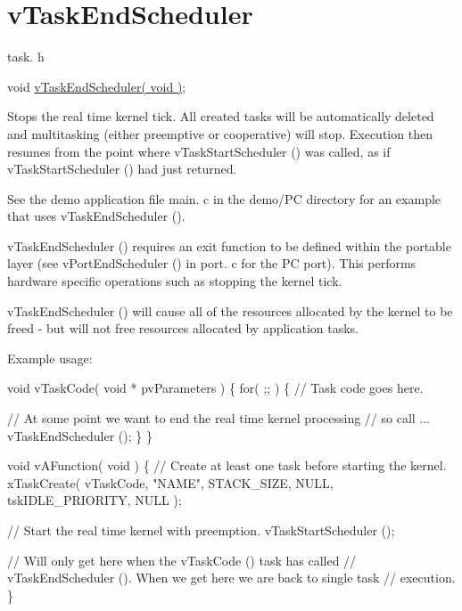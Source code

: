\hypertarget{group__vTaskEndScheduler}{}\section{v\+Task\+End\+Scheduler}
\label{group__vTaskEndScheduler}
task. h 
\begin{DoxyPre}void \hyperlink{task_8h_a1651e13c7ccd6273f53a62425ec79a15}{vTaskEndScheduler( void )};\end{DoxyPre}


Stops the real time kernel tick. All created tasks will be automatically deleted and multitasking (either preemptive or cooperative) will stop. Execution then resumes from the point where v\+Task\+Start\+Scheduler () was called, as if v\+Task\+Start\+Scheduler () had just returned.

See the demo application file main. c in the demo/\+PC directory for an example that uses v\+Task\+End\+Scheduler ().

v\+Task\+End\+Scheduler () requires an exit function to be defined within the portable layer (see v\+Port\+End\+Scheduler () in port. c for the PC port). This performs hardware specific operations such as stopping the kernel tick.

v\+Task\+End\+Scheduler () will cause all of the resources allocated by the kernel to be freed -\/ but will not free resources allocated by application tasks.

Example usage\+: 
\begin{DoxyPre}
void vTaskCode( void * pvParameters )
\{
    for( ;; )
    \{
     // Task code goes here.\end{DoxyPre}



\begin{DoxyPre}     // At some point we want to end the real time kernel processing
     // so call ...
     vTaskEndScheduler ();
    \}
\}\end{DoxyPre}



\begin{DoxyPre}void vAFunction( void )
\{
    // Create at least one task before starting the kernel.
    xTaskCreate( vTaskCode, "NAME", STACK\_SIZE, NULL, tskIDLE\_PRIORITY, NULL );\end{DoxyPre}



\begin{DoxyPre}    // Start the real time kernel with preemption.
    vTaskStartScheduler ();\end{DoxyPre}



\begin{DoxyPre}    // Will only get here when the vTaskCode () task has called
    // vTaskEndScheduler ().  When we get here we are back to single task
    // execution.
\}
  \end{DoxyPre}
 
